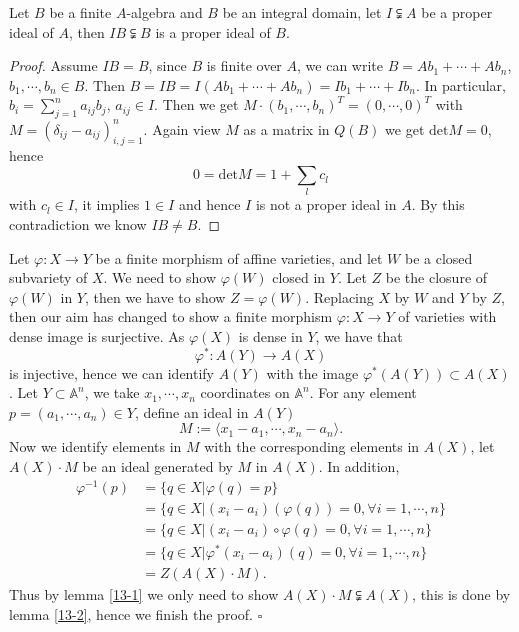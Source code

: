 \begin{lemma}\label{13-2}
	Let $ B $ be a finite $ A $-algebra and $ B $ be an integral domain, let $ I\subsetneqq A $ be a proper ideal of $ A $, then $ IB\subsetneqq B $ is a proper ideal of $ B $.
\end{lemma}
\begin{proof}
	Assume $ IB = B$, since $ B $ is finite over $ A $, we can write $ B=Ab_1+\cdots+Ab_n $, $ b_1,\cdots,b_n\in B $. Then $ B=IB=I(Ab_1+\cdots+Ab_n)=Ib_1+\cdots+Ib_n $. In particular, $ b_i=\sum\limits_{j=1}^{n}a_{ij}b_j $, $ a_{ij}\in I $. Then we get $ M\cdot (b_1,\cdots,b_n)^{T}=(0,\cdots,0)^{T} $ with $ M=(\delta_{ij}-a_{ij})_{i,j=1}^{n} $. Again view $ M $ as a matrix in $ Q(B) $ we get $ \text{det}M=0 $, hence
	$$
		0=\text{det}M=1+\sum\limits_{l}c_l
	$$
	with $ c_l\in I $, it implies $ 1\in I $ and hence $ I $ is not a proper ideal in $ A $. By this contradiction we know $ IB\neq B $.
\end{proof}
	Let $ \varphi :X\to Y $ be a finite morphism of affine varieties, and let $ W $ be a closed subvariety of $ X $. We need  to show $ \varphi(W) $ closed in $ Y $. Let $ Z $ be the closure of $ \varphi(W) $ in $ Y $, then we have to show $ Z=\varphi(W) $. Replacing $ X $ by $ W $ and $ Y $ by $ Z $, then our aim has changed to show a finite morphism $ \varphi:X\to Y $ of varieties with dense image is surjective.
	As $ \varphi (X) $ is dense in $ Y $, we have that
	$$
		\varphi^{\ast}:A(Y)\to A(X)
	$$
	is injective, hence we can identify $ A(Y) $ with the image $ \varphi^{\ast}(A(Y))\subset A(X)$. Let $ Y\subset \mathbb{A}^n $, we take $ x_1,\cdots,x_n $ coordinates on $ \mathbb{A}^n $. For any element $ p=(a_1,\cdots,a_n)\in Y $, define an ideal in $ A(Y) $
	$$ M:=\langle x_1-a_1,\cdots,x_n-a_n \rangle. $$
	Now we identify elements in $ M $ with the corresponding elements in $ A(X) $,  let $ A(X)\cdot M $ be an ideal generated by $ M $ in $ A(X) $. In addition,
	\begin{align*}
		\varphi^{-1}(p) & =  \lbrace q\in X|\varphi(q)=p \rbrace                                      \\
		{ }             & =  \lbrace q\in X|(x_i-a_i)(\varphi(q))=0,\forall i=1,\cdots,n \rbrace      \\
		{ }             & =  \lbrace q\in X|(x_i-a_i)\circ \varphi (q)=0,\forall i=1,\cdots,n \rbrace \\
		{ }             & =  \lbrace q\in X|\varphi^\ast(x_i-a_i)(q)=0,\forall i=1,\cdots,n  \rbrace  \\
		{ }             & =  Z(A(X)\cdot M).
	\end{align*}
	Thus by lemma \ref{13-1} we only need to show $ A(X)\cdot M \subsetneqq A(X)$, this is done by lemma \ref{13-2}, hence we finish the proof.
\hfill $\square $ \par

